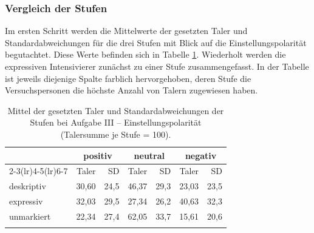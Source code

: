 \subsubsection{Vergleich der Stufen} \label{abs:VP-Vergleich636}


Im ersten Schritt werden die Mittelwerte der gesetzten Taler und Standardabweichungen für die drei Stufen mit Blick auf die Einstellungspolarität begutachtet. Diese Werte befinden sich in Tabelle \ref{Bedin}. Wiederholt werden die expressiven Intensivierer zunächst zu einer Stufe zusammengefasst. In der Tabelle ist jeweils diejenige Spalte farblich hervorgehoben, deren Stufe die Versuchspersonen die höchste Anzahl von Talern zugewiesen haben.

%
\begin{table}
\begin{tabularx}{\textwidth}{X rr rr rr}
\lsptoprule
  & \multicolumn{2}{c}{ {positiv}} & \multicolumn{2}{c}{ {neutral}} & \multicolumn{2}{c}{ {negativ}} \\
  \cmidrule(lr){2-3}\cmidrule(lr){4-5}\cmidrule(lr){6-7}
   & Taler  &  SD& Taler  &  SD& Taler  &  SD\\
\midrule
{deskriptiv} & 30,60 & 24,5   & \cellcolor[gray]{.90}46,37 & \cellcolor[gray]{.90}29,3    &   23,03 & 23,5 \\
{expressiv} & 32,03 & 29,5   & 27,34 & 26,2   &   \cellcolor[gray]{.90} 40,63 & \cellcolor[gray]{.90}32,3 \\
{unmarkiert} & 22,34  & 27,4  & \cellcolor[gray]{.90}62,05 & \cellcolor[gray]{.90}33,7   &   15,61 & 20,6 \\
\lspbottomrule
\end{tabularx}
\caption[Mittel der gesetzten Taler der Stufen bei {Aufgabe III} von Experiment 1]{Mittel der gesetzten Taler und Standardabweichungen der Stufen bei Aufgabe III -- Einstellungspolarität (Talersumme je Stufe = 100).}
\label{Bedin}
\end{table}


